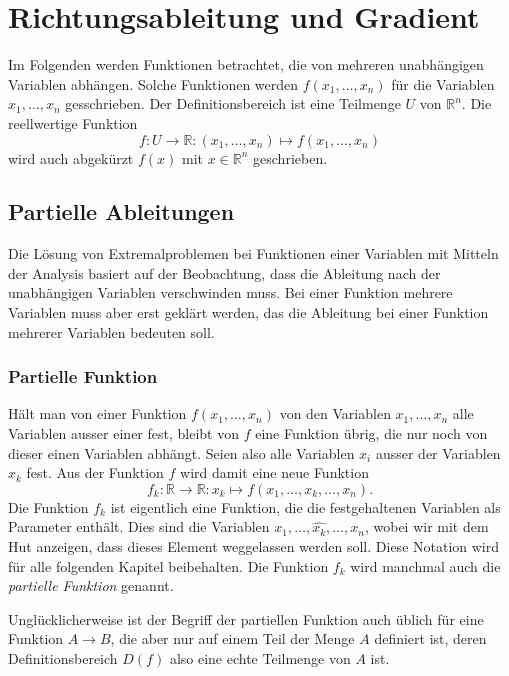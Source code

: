 %
%
%
\section{Richtungsableitung und Gradient
\label{buch:fuvar:section:richtungsableitung}}
Im Folgenden werden Funktionen betrachtet, die von mehreren unabhängigen
Variablen abhängen.
Solche Funktionen werden $f(x_1,\dots,x_n)$ für die Variablen
$x_1,\dots,x_n$ gesschrieben.
Der Definitionsbereich ist eine Teilmenge $U$ von $\mathbb{R}^n$.
Die reellwertige Funktion
\[
f\colon U\to\mathbb{R} : (x_1,\dots,x_n) \mapsto f(x_1,\dots, x_n)
\]
wird auch abgekürzt $f(x)$ mit $x\in\mathbb{R}^n$ geschrieben.

%
%
\subsection{Partielle Ableitungen}
Die Lösung von Extremalproblemen bei Funktionen einer Variablen
mit Mitteln der Analysis basiert auf der Beobachtung, dass die Ableitung
nach der unabhängigen Variablen verschwinden muss.
Bei einer Funktion mehrere Variablen muss aber erst geklärt werden,
das die Ableitung bei einer Funktion mehrerer Variablen bedeuten soll.

%
%
\subsubsection{Partielle Funktion}
Hält man von einer Funktion $f(x_1,\dots,x_n)$ von den Variablen
$x_1,\dots,x_n$ alle Variablen ausser einer fest, bleibt von $f$ eine
Funktion übrig, die nur noch von dieser einen Variablen abhängt.
Seien also alle Variablen $x_i$ ausser der Variablen $x_k$ fest.
Aus der Funktion $f$ wird damit eine neue Funktion
\[
f_k
\colon
\mathbb{R} \to \mathbb{R}
:
x_k \mapsto f(x_1,\dots,x_k,\dots,x_n).
\]
Die Funktion $f_k$ ist eigentlich eine Funktion, die die festgehaltenen
Variablen als Parameter enthält.
Dies sind die Variablen $x_1,\dots,\widehat{x_k},\dots,x_n$, wobei
wir mit dem Hut anzeigen, dass dieses Element weggelassen werden soll.
Diese Notation wird für alle folgenden Kapitel beibehalten.
Die Funktion $f_k$ wird manchmal auch die {\em partielle Funktion}
%
%
genannt.

Unglücklicherweise ist der Begriff der partiellen Funktion auch 
üblich für eine Funktion $A\to B$, die aber nur auf einem Teil
der Menge $A$ definiert ist, deren Definitionsbereich $D(f)$ also
eine echte Teilmenge von $A$ ist.

